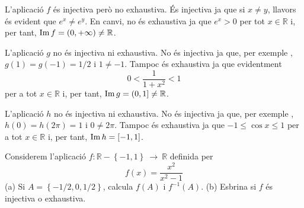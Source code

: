 \begin{solucio}
L'aplicaci\'{o} $f$ \'{e}s injectiva per\`{o} no exhaustiva. \'{E}s
injectiva ja que si $x\neq y$, llavors \'{e}s evident que $e^{x}\neq e^{y}$.
En canvi, no \'{e}s exhaustiva ja que $e^{x}>0$ per tot $x\in \mathbb{R}$ i,
per tant, $\mathop{\rm Im}\nolimits f=(0,+\infty )\neq \mathbb{R}$.

L'aplicaci\'{o} $g$ no \'{e}s injectiva ni exhaustiva. No \'{e}s injectiva
ja que, per exemple , $g(1)=g(-1)=1/2$ i $1\neq -1$. Tampoc \'{e}s
exhaustiva ja que evidentment
\begin{equation*}
0<\frac{1}{1+x^{2}}<1
\end{equation*}%
per a tot $x\in \mathbb{R}$ i, per tant, $\mathop{\rm Im}\nolimits g=(0,1]\neq \mathbb{R}$.

L'aplicaci\'{o} $h$ no \'{e}s injectiva ni exhaustiva. No \'{e}s injectiva
ja que, per exemple , $h(0)=h(2\pi )=1$ i $0\neq 2\pi $. Tampoc \'{e}s
exhaustiva ja que $-1\leq \cos x\leq 1$ per a tot $x\in \mathbb{R}$ i, per
tant, $\mathop{\rm Im}\nolimits h=[-1,1]$.
\end{solucio}

\begin{exercici}
Considerem l'aplicaci\'{o} $f:\mathbb{R}-\left\{ -1,1\right\}
~\longrightarrow ~\mathbb{R}$ definida per%
\begin{equation*}
f(x)=\frac{x^{2}}{x^{2}-1}
\end{equation*}%
(a) Si $A=\left\{ -1/2,0,1/2\right\} $, calcula $f(A)$ i $f^{-1}(A)$. (b)
Esbrina si $f$ \'{e}s injectiva o exhaustiva.
\end{exercici}

